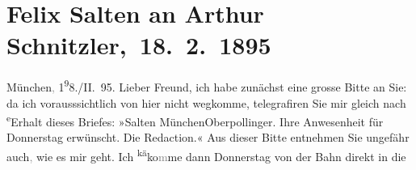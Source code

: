 

         
         \renewcommand{\erwaehntePersonen}{Personen: Hermann Bahr, Richard Beer-Hofmann, Otto Brahm, Julius von Gans-Ludassy, Hugo von Hofmannsthal, Maria Charlotte Lamberg, Charlotte Pohl-Glas, Felix Salten}
         \renewcommand{\erwaehnteInstitutionen}{Institutionen: Deutsches Theater Berlin, Wiener Musik- und Theatergesellschaft}
         \renewcommand{\erwaehnteOrte}{Orte: Hotel Oberpollinger, München, Volkstheater, Wien}
         \renewcommand{\erwaehnteWerke}{Werke: Adele Sandrock, Die Zeit. Wiener Wochenschrift, Liebelei. Schauspiel in drei Akten}
               \section[ Felix Salten an Arthur Schnitzler, 18. 2. 1895]{ Felix Salten an Arthur Schnitzler, 18. 2. 1895}\nopagebreak{}\rehead{ }\begin{ledgroupsized}[t]{13cm}\normalsize\beginnumbering \toendnotes[C]{\smallbreak\pagebreak[2]} 
\toendnotes[C]{\smallbreak}\pstart
           \raggedleft{}{\pb}München\textcolor{gray}{,}{ }1\substVorne{}\textsuperscript{9}\substDazwischen{}8\substHinten{}./II. 95.\pend
           \pstart
           Lieber Freund, ich habe zunächst eine grosse Bitte an
               Sie: da ich vorausssichtlich von hier nicht wegkomme, telegrafiren Sie mir gleich nach \substVorne{}\textsuperscript{e}\substDazwischen{}E\substHinten{}rhalt dieses Briefes: »Salten MünchenOberpollinger. Ihre Anwesenheit für Donnerstag erwünscht. Die Redaction.«\pend
           \pstart
           Aus dieser Bitte entnehmen Sie ungefähr auch\textcolor{gray}{,} wie es mir geht. Ich \substVorne{}\textsuperscript{kä}\substDazwischen{}ko\textcolor{gray}{m}\substHinten{}me dann Donnerstag von der Bahn direkt in die

\end{ledgroupsized}
